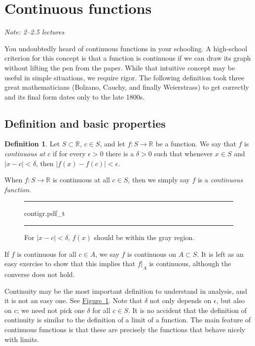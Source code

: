 \documentclass[12pt]{book}
\newenvironment{myfigureht}{%
\begin{figure}[h!t]
\noindent\rule{\textwidth}{0.4pt}\vspace{12pt}\par\centering}%
{\par\noindent\rule{\textwidth}{0.4pt}
\end{figure}}
\newcommand{\abs}[1]{\left\lvert {#1} \right\rvert}
\newcommand{\R}{{\mathbb{R}}}
\newcommand{\myindex}[1]{#1\index{#1}}
\newcommand{\sectionnotes}[1]{\noindent \emph{Note: #1} \medskip \par}
\newcommand{\sectionnewpage}{\clearpage}
\theoremstyle{plain}
\theoremstyle{remark}
\theoremstyle{definition}
\newtheorem{defn}[thm]{Definition}
\theoremstyle{exercise}
\theoremstyle{example}
\newcommand{\figureref}[1]{\hyperref[#1]{Figure~\ref*{#1}}}
\begin{document}

\sectionnewpage
\section{Continuous functions}
\label{sec:cont}

\sectionnotes{2--2.5 lectures}

You undoubtedly heard of continuous functions in your schooling.  A
high-school criterion for this concept is that a function is continuous if
we can draw its graph without lifting the pen from the paper.  While that
intuitive concept may be useful in simple situations, we require
rigor.  The following definition took three great mathematicians
(Bolzano, Cauchy, and finally Weierstrass) to get correctly and its final
form dates only to the late 1800s.

\subsection{Definition and basic properties}

\begin{defn}
Let $S \subset \R$, $c \in S$, and let $f \colon S \to \R$ be a function.
We say
that $f$ is \emph{continuous at $c$}
if for every $\epsilon > 0$
there is a $\delta > 0$ such that whenever $x \in S$ and $\abs{x-c} <
\delta$, then
$\abs{f(x)-f(c)} < \epsilon$.


When $f \colon S \to \R$ is continuous at all $c \in S$, then we simply say
$f$ is a \emph{\myindex{continuous function}}.
\end{defn}
\begin{myfigureht}
{contigr.pdf_t}
\caption{For $\abs{x-c} < \delta$, $f(x)$ should be within the gray region.\label{fig:contigr}}
\end{myfigureht}

If $f$ is continuous for all $c \in A$, we say
$f$ is continuous on $A \subset S$.  It is left as an easy exercise to
show that this implies that $f|_A$ is continuous, although
the converse does not hold.

Continuity may be the most important definition to understand in analysis,
and it is not an easy one.  See \figureref{fig:contigr}.  Note that $\delta$ not only
depends on $\epsilon$, but also on $c$;  we need not pick
one $\delta$ for all $c \in S$.
It is no accident 
that the definition of continuity is similar to the definition of a
limit of a function.  The main feature of continuous functions
is that these are precisely the functions that behave nicely with limits.
\end{document}
